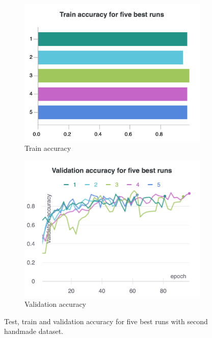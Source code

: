 \begin{figure}[hbtp]
\begin{subfigure}{0.31\textwidth}
			\includegraphics[width=\linewidth]{fig/results/wandb/second_handmade_sweep/charts/Section-2-Panel-1-mvdok5l4p.png}
			\caption{Train accuracy}
		\end{subfigure}
		\hspace*{\fill}   %
		\begin{subfigure}{0.31\textwidth}
			\centering
			\includegraphics[width=\linewidth]{fig/results/wandb/second_handmade_sweep/charts/Section-2-Panel-2-p9dhpnuq6.png}
			\caption{Validation accuracy}
		\end{subfigure}
		\caption{Test, train and validation accuracy for five best runs with second handmade dataset.}
	\end{figure}

